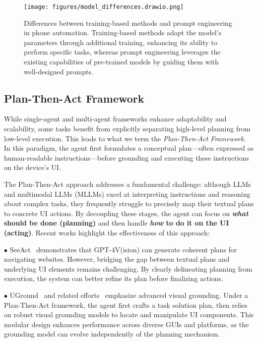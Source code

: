 \begin{figure}[ht] 
    \centering 
    \texttt{[image: figures/model\_differences.drawio.png]} 
    \caption{Differences between training-based methods and prompt engineering in phone automation. Training-based methods adapt the model's parameters through additional training, enhancing its ability to perform specific tasks, whereas prompt engineering leverages the existing capabilities of pre-trained models by guiding them with well-designed prompts. } 
    \label{fig:model_differences} 
\end{figure}

\subsection{Plan-Then-Act Framework}
\label{subsec:plan_then_act}

While single-agent and multi-agent frameworks enhance adaptability and scalability, some tasks benefit from explicitly separating high-level planning from low-level execution. This leads to what we term the \textit{Plan-Then-Act Framework}. In this paradigm, the agent first formulates a conceptual plan—often expressed as human-readable instructions—before grounding and executing these instructions on the device’s UI.

The Plan-Then-Act approach addresses a fundamental challenge: although LLMs and multimodal LLMs (MLLMs) excel at interpreting instructions and reasoning about complex tasks, they frequently struggle to precisely map their textual plans to concrete UI actions. By decoupling these stages, the agent can focus on \textbf{\emph{what} should be done (planning)} and then handle \textbf{\emph{how} to do it on the UI (acting)}. Recent works highlight the effectiveness of this approach:

\noindent$\bullet$ SeeAct~\cite{zheng2024gpt} demonstrates that GPT-4V(ision)\cite{achiam2023gpt} can generate coherent plans for navigating websites. However, bridging the gap between textual plans and underlying UI elements remains challenging. By clearly delineating planning from execution, the system can better refine its plan before finalizing actions.

\noindent$\bullet$ UGround~\cite{gou2024navigating} and related efforts~\cite{you2024ferret,zhang2024ui-hawk} emphasize advanced visual grounding. Under a Plan-Then-Act framework, the agent first crafts a task solution plan, then relies on robust visual grounding models to locate and manipulate UI components. This modular design enhances performance across diverse GUIs and platforms, as the grounding model can evolve independently of the planning mechanism.

